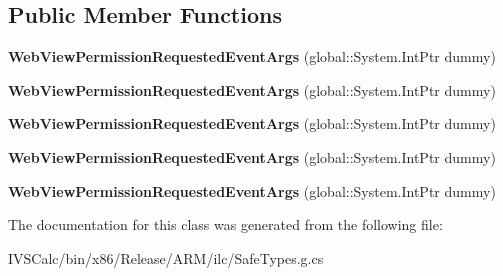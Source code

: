 \subsection*{Public Member Functions}
\begin{DoxyCompactItemize}
\item 
\mbox{\label{class_windows_1_1_u_i_1_1_xaml_1_1_controls_1_1_web_view_permission_requested_event_args_ae3ffa1f3927cb4d1d6cdecbc9c1069d1}} 
{\bfseries Web\+View\+Permission\+Requested\+Event\+Args} (global\+::\+System.\+Int\+Ptr dummy)
\item 
\mbox{\label{class_windows_1_1_u_i_1_1_xaml_1_1_controls_1_1_web_view_permission_requested_event_args_ae3ffa1f3927cb4d1d6cdecbc9c1069d1}} 
{\bfseries Web\+View\+Permission\+Requested\+Event\+Args} (global\+::\+System.\+Int\+Ptr dummy)
\item 
\mbox{\label{class_windows_1_1_u_i_1_1_xaml_1_1_controls_1_1_web_view_permission_requested_event_args_ae3ffa1f3927cb4d1d6cdecbc9c1069d1}} 
{\bfseries Web\+View\+Permission\+Requested\+Event\+Args} (global\+::\+System.\+Int\+Ptr dummy)
\item 
\mbox{\label{class_windows_1_1_u_i_1_1_xaml_1_1_controls_1_1_web_view_permission_requested_event_args_ae3ffa1f3927cb4d1d6cdecbc9c1069d1}} 
{\bfseries Web\+View\+Permission\+Requested\+Event\+Args} (global\+::\+System.\+Int\+Ptr dummy)
\item 
\mbox{\label{class_windows_1_1_u_i_1_1_xaml_1_1_controls_1_1_web_view_permission_requested_event_args_ae3ffa1f3927cb4d1d6cdecbc9c1069d1}} 
{\bfseries Web\+View\+Permission\+Requested\+Event\+Args} (global\+::\+System.\+Int\+Ptr dummy)
\end{DoxyCompactItemize}


The documentation for this class was generated from the following file\+:\begin{DoxyCompactItemize}
\item 
I\+V\+S\+Calc/bin/x86/\+Release/\+A\+R\+M/ilc/Safe\+Types.\+g.\+cs\end{DoxyCompactItemize}
